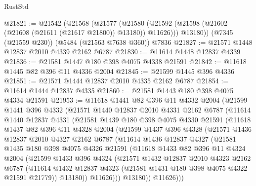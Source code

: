 \begin{lexlean}{RustStd}
\begin{coremodule}
@21821 := @21542
    (@21568
      (@21577
        (@21580 (@21592 (@21598 (@21602 (@21608 (@21611 (@21617 @21800)) @13180)) @11626)))
        @13180))
    (@7345 (@21559 @230))
    (@5484 (@21563 @7638 @360))
    @7836
@21827 := @21571 @1448 @12837 @2010 @4339 @2162 @6787
@21830 := @11614 @1448 @12837 @4339
@21836 := @21581 @1447 @180 @398 @4075 @4338 @21591
@21842 := @11618 @1445 @82 @396 @11 @4336 @2004
@21845 := @21599 @1445 @396 @4336
@21851 := @21571 @1444 @12837 @2010 @4335 @2162 @6787
@21854 := @11614 @1444 @12837 @4335
@21860 := @21581 @1443 @180 @398 @4075 @4334 @21591
@21953 := @11618
    @1441
    @82
    @396
    @11
    @4332
    @2004
    (@21599
      @1441
      @396
      @4332
      (@21571
        @1440
        @12837
        @2010
        @4331
        @2162
        @6787
        (@11614
          @1440
          @12837
          @4331
          (@21581
            @1439
            @180
            @398
            @4075
            @4330
            @21591
            (@11618
              @1437
              @82
              @396
              @11
              @4328
              @2004
              (@21599
                @1437
                @396
                @4328
                (@21571
                  @1436
                  @12837
                  @2010
                  @4327
                  @2162
                  @6787
                  (@11614
                    @1436
                    @12837
                    @4327
                    (@21581
                      @1435
                      @180
                      @398
                      @4075
                      @4326
                      @21591
                      (@11618
                        @1433
                        @82
                        @396
                        @11
                        @4324
                        @2004
                        (@21599
                          @1433
                          @396
                          @4324
                          (@21571
                            @1432
                            @12837
                            @2010
                            @4323
                            @2162
                            @6787
                            (@11614
                              @1432
                              @12837
                              @4323
                              (@21581 @1431 @180 @398 @4075 @4322 @21591 @21779))
                            @13180))
                        @11626)))
                  @13180))
              @11626)))

\end{coremodule}
\end{lexlean}
